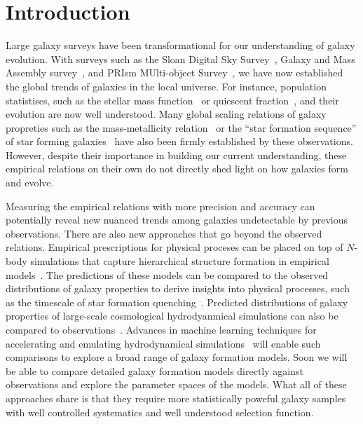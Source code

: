 \section{Introduction} \label{sec:intro} 
Large galaxy surveys have been transformational for our understanding of galaxy
evolution. 
With surveys such as the Sloan Digital Sky Survey~\citep[SDSS;][]{york2000},
Galaxy and Mass Assembly survey~\citep[GAMA;][]{driver2011}, and 
PRIsm MUlti-object Survey~\citep[PRIMUS;][]{coil2011}, 
we have now established the global trends of galaxies in the local universe. 
For instance, population statistiscs, such as the stellar mass
function~\citep{li2009, marchesini2009, moustakas2013} or quiescent
fraction~\citep{kauffmann2003a, blanton2003, baldry2006, taylor2009}, and their
evolution are now well understood. 
Many global scaling relations of galaxy propreties such as the mass-metallicity
relation~\citep{tremonti2004} or
the ``star formation sequence'' of star forming galaxies~\citep{noeske2007,
daddi2007, salim2007, speagle2014} have also been firmly established by these
observations. 
However, despite their importance in building our current understanding, these
empirical relations on their own do not directly shed light on how galaxies
form and evolve. 

Measuring the empirical relations with more precision and accuracy can
potentially reveal new nuanced trends among galaxies undetectable by previous
observations.
There are also new approaches that go beyond the observed relations.
Empirical prescriptions for physical proceses can be placed on top of $N$-body
simulations that capture hierarchical structure formation in empirical 
models~\citep[\emph{e.g.} {\sc UniverseMachine}][]{behroozi2019}. 
The predictions of these models can be compared to the observed distributions
of galaxy properties to derive insights into physical processes, such as the
timescale of star formation quenching~\citep{wetzel2013, hahn2017, tinker2017}. 
Predicted distributions of galaxy properties of large-scale cosmological 
hydrodyanmical simulations can also be compared to 
observations~\citep[\emph{e.g.}][]{genel2014, somerville2015a, dave2017a,
trayford2017, dickey2021, donnari2021}.
Advances in machine learning techniques for accelerating and emulating
hydrodynamical simulations~\citep{villaescusa-navarro2021} will enable such
comparisons to explore a broad range of galaxy formation models.
Soon we will be able to compare detailed galaxy formation models directly
against observations and explore the parameter spaces of the models. 
What all of these approaches share is that they require more statistically
poweful galaxy samples with well controlled systematics and well understood
selection function. 

